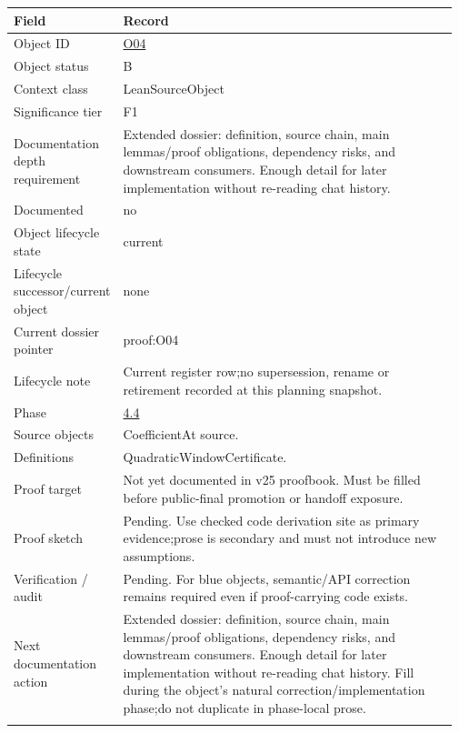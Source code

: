 \begin{longtable}{L{0.16\linewidth} L{0.81\linewidth}}
\hline
\textbf{Field} & \textbf{Record}\\
\hline
Object ID & \hyperlink{object-row-O04}{O04}\\
\hline\addlinespace[0.20em]
Object status & B\\
\hline\addlinespace[0.20em]
Context class & LeanSourceObject\\
\hline\addlinespace[0.20em]
Significance tier & F1\\
\hline\addlinespace[0.20em]
Documentation depth requirement & Extended dossier: definition, source chain, main lemmas/\allowbreak{}proof obligations, dependency risks, and downstream consumers. Enough detail for later implementation without re-reading chat history.\\
\hline\addlinespace[0.20em]
Documented & no\\
\hline\addlinespace[0.20em]
Object lifecycle state & current\\
\hline\addlinespace[0.20em]
Lifecycle successor/\allowbreak{}current object & none\\
\hline\addlinespace[0.20em]
Current dossier pointer & proof:O04\\
\hline\addlinespace[0.20em]
Lifecycle note & Current register row;\newline no supersession, rename or retirement recorded at this planning snapshot.\\
\hline\addlinespace[0.20em]
Phase & \hyperlink{phase-row-4-4}{4.4}\\
\hline\addlinespace[0.20em]
Source objects & CoefficientAt source.\\
\hline\addlinespace[0.20em]
Definitions & QuadraticWindowCertificate.\\
\hline\addlinespace[0.20em]
Proof target & Not yet documented in v25 proofbook. Must be filled before public-final promotion or handoff exposure.\\
\hline\addlinespace[0.20em]
Proof sketch & Pending. Use checked code derivation site as primary evidence;\newline prose is secondary and must not introduce new assumptions.\\
\hline\addlinespace[0.20em]
Verification /\allowbreak{} audit & Pending. For blue objects, semantic/\allowbreak{}API correction remains required even if proof-carrying code exists.\\
\hline\addlinespace[0.20em]
Next documentation action & Extended dossier: definition, source chain, main lemmas/\allowbreak{}proof obligations, dependency risks, and downstream consumers. Enough detail for later implementation without re-reading chat history. Fill during the object's natural correction/\allowbreak{}implementation phase;\newline do not duplicate in phase-local prose.\\
\hline\addlinespace[0.20em]
\end{longtable}
